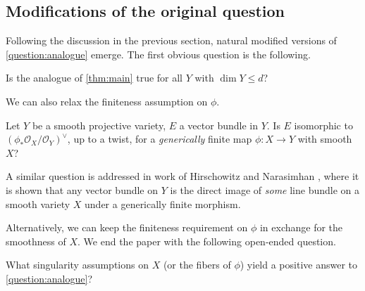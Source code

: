 \documentclass[11 pt]{amsart}
\renewcommand{\O}{{\mathcal O}}
\providecommand {\from}{{\colon}}
\numberwithin{equation}{section}
\begin{document}
\subsection{Modifications of the original question}
Following the discussion in the previous section, natural modified versions of \autoref{question:analogue} emerge. 
The first obvious question is the following.
\begin{question}
  Is the analogue of \autoref{thm:main} true for all $Y$ with $\dim Y \leq d$?
\end{question}

We can also relax the finiteness assumption on $\phi$.
\begin{question}
  Let $Y$ be a smooth projective variety, $E$ a vector bundle in $Y$.
  Is $E$ isomorphic to $(\phi_* \O_X/\O_Y)^\vee$, up to a twist, for a \emph{generically} finite map $\phi \from X \to Y$ with smooth $X$?
\end{question}  

\begin{remark}
  A similar question is addressed in work of Hirschowitz and Narasimhan \cite{hir.nar:94}, where it is shown that any vector bundle on $Y$ is the direct image of {\sl some} line bundle on a smooth variety $X$ under a generically finite morphism. 
\end{remark} 

Alternatively, we can keep the finiteness requirement on $\phi$ in exchange for the smoothness of $X$.
We end the paper with the following open-ended question.

\begin{question}
  What singularity assumptions on $X$ (or the fibers of $\phi$) yield a positive answer to \autoref{question:analogue}?
\end{question} 
\end{document}

